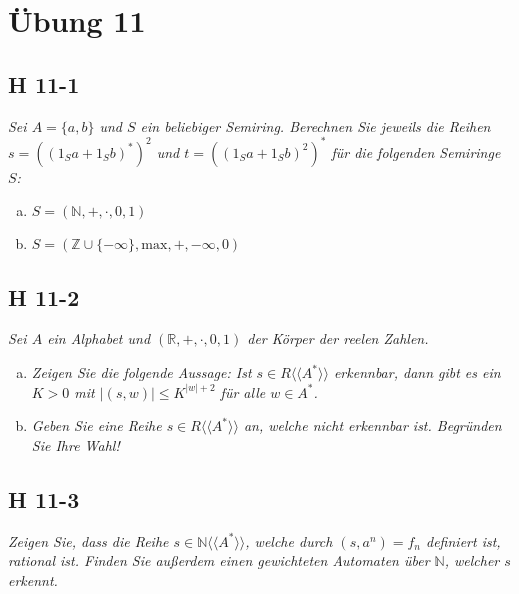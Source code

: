 \documentclass{scrartcl}
\begin{document}
\section{Übung 11}

\subsection{H 11-1}

\textsl{Sei $A = \{a, b\}$ und $S$ ein beliebiger Semiring. Berechnen Sie jeweils die Reihen $s = ((1_S a + 1_S b)^*)^2$ und $t = ((1_S a + 1_S b)^2)^*$ für die folgenden Semiringe $S$:}

\begin{enumerate}[(a)]
    \item $S = (\mathbb{N}, +, \cdot, 0, 1)$
    \item $S = (\mathbb{Z} \cup \{-\infty\}, \text{max}, +, -\infty, 0)$
\end{enumerate}

\subsection{H 11-2}

\textsl{Sei $A$ ein Alphabet und $(\mathbb{R}, +, \cdot, 0, 1)$ der Körper der reelen Zahlen.}

\begin{enumerate}[(a)]
    \item \textsl{Zeigen Sie die folgende Aussage: Ist $s \in R\langle\langle A^* \rangle\rangle$ erkennbar, dann gibt es ein $K > 0$ mit $|(s, w)| \leq K^{|w|+2}$ für alle $w \in A^*$.}
    \item \textsl{Geben Sie eine Reihe $s \in R\langle\langle A^* \rangle\rangle$ an, welche nicht erkennbar ist. Begründen Sie Ihre Wahl!}
\end{enumerate}

\subsection{H 11-3}

\textsl{Zeigen Sie, dass die Reihe $s \in \mathbb{N}\langle\langle A^* \rangle\rangle$, welche durch $(s, a^n) = f_n$ definiert ist, rational ist. Finden Sie außerdem einen gewichteten Automaten über $\mathbb{N}$, welcher $s$ erkennt.}
\end{document}

